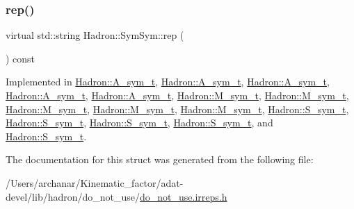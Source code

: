 \mbox{\label{structHadron_1_1SymSym_aa6e588740862036933a9efe085a5e5e5}} 
\subsubsection{\texorpdfstring{rep()}{rep()}\hspace{0.1cm}{\footnotesize\ttfamily [2/2]}}
{\footnotesize\ttfamily virtual std\+::string Hadron\+::\+Sym\+Sym\+::rep (\begin{DoxyParamCaption}{ }\end{DoxyParamCaption}) const\hspace{0.3cm}{\ttfamily [pure virtual]}}



Implemented in \mbox{\hyperlink{structHadron_1_1A__sym__t_ac60fe125eeb713995aafa4712e23f919}{Hadron\+::\+A\+\_\+sym\+\_\+t}}, \mbox{\hyperlink{structHadron_1_1A__sym__t_ac60fe125eeb713995aafa4712e23f919}{Hadron\+::\+A\+\_\+sym\+\_\+t}}, \mbox{\hyperlink{structHadron_1_1A__sym__t_ac60fe125eeb713995aafa4712e23f919}{Hadron\+::\+A\+\_\+sym\+\_\+t}}, \mbox{\hyperlink{structHadron_1_1A__sym__t_ac60fe125eeb713995aafa4712e23f919}{Hadron\+::\+A\+\_\+sym\+\_\+t}}, \mbox{\hyperlink{structHadron_1_1A__sym__t_ac60fe125eeb713995aafa4712e23f919}{Hadron\+::\+A\+\_\+sym\+\_\+t}}, \mbox{\hyperlink{structHadron_1_1M__sym__t_ad90bc816709bb65ec3e0b804090fbefe}{Hadron\+::\+M\+\_\+sym\+\_\+t}}, \mbox{\hyperlink{structHadron_1_1M__sym__t_ad90bc816709bb65ec3e0b804090fbefe}{Hadron\+::\+M\+\_\+sym\+\_\+t}}, \mbox{\hyperlink{structHadron_1_1M__sym__t_ad90bc816709bb65ec3e0b804090fbefe}{Hadron\+::\+M\+\_\+sym\+\_\+t}}, \mbox{\hyperlink{structHadron_1_1M__sym__t_ad90bc816709bb65ec3e0b804090fbefe}{Hadron\+::\+M\+\_\+sym\+\_\+t}}, \mbox{\hyperlink{structHadron_1_1M__sym__t_ad90bc816709bb65ec3e0b804090fbefe}{Hadron\+::\+M\+\_\+sym\+\_\+t}}, \mbox{\hyperlink{structHadron_1_1S__sym__t_a1a8ccb60f6d70c9a00b8683ad8eac195}{Hadron\+::\+S\+\_\+sym\+\_\+t}}, \mbox{\hyperlink{structHadron_1_1S__sym__t_a1a8ccb60f6d70c9a00b8683ad8eac195}{Hadron\+::\+S\+\_\+sym\+\_\+t}}, \mbox{\hyperlink{structHadron_1_1S__sym__t_a1a8ccb60f6d70c9a00b8683ad8eac195}{Hadron\+::\+S\+\_\+sym\+\_\+t}}, \mbox{\hyperlink{structHadron_1_1S__sym__t_a1a8ccb60f6d70c9a00b8683ad8eac195}{Hadron\+::\+S\+\_\+sym\+\_\+t}}, and \mbox{\hyperlink{structHadron_1_1S__sym__t_a1a8ccb60f6d70c9a00b8683ad8eac195}{Hadron\+::\+S\+\_\+sym\+\_\+t}}.



The documentation for this struct was generated from the following file\+:\begin{DoxyCompactItemize}
\item 
/\+Users/archanar/\+Kinematic\+\_\+factor/adat-\/devel/lib/hadron/do\+\_\+not\+\_\+use/\mbox{\hyperlink{adat-devel_2lib_2hadron_2do__not__use_2do__not__use_8irreps_8h}{do\+\_\+not\+\_\+use.\+irreps.\+h}}\end{DoxyCompactItemize}
